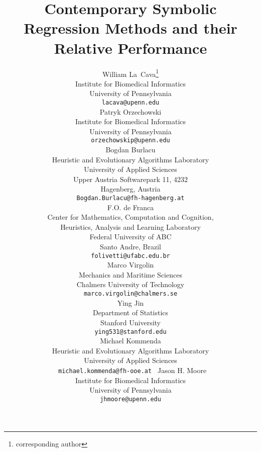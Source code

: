 \documentclass{article}
\title{Contemporary Symbolic Regression Methods and their Relative Performance}
\author{%
        William La~Cava\footnote{corresponding author} \\
        Institute for Biomedical Informatics\\
        University of Pennsylvania\\
        \texttt{lacava@upenn.edu} \\
        \And
        Patryk Orzechowski \\
        Institute for Biomedical Informatics\\
        University of Pennsylvania\\
        \texttt{orzechowskip@upenn.edu} \\
        \And
        Bogdan Burlacu \\
        Heuristic and Evolutionary Algorithms Laboratory \\
        University of Applied Sciences \\ 
        Upper Austria Softwarepark 11, 4232 \\
        Hagenberg, Austria \\
        \texttt{Bogdan.Burlacu@fh-hagenberg.at} \\
        \And
        F.O. de Franca \\
        Center for Mathematics, Computation and Cognition, \\
        Heuristics, Analysis and Learning Laboratory \\
        Federal University of ABC \\
        Santo Andre, Brazil \\
        \texttt{folivetti@ufabc.edu.br} \\
        \And
        Marco Virgolin \\
        Mechanics and Maritime Sciences \\
        Chalmers University of Technology \\
        \texttt{ marco.virgolin@chalmers.se } \\
        \And
        Ying Jin \\
        Department of Statistics \\
        Stanford University \\ 
        \texttt{ying531@stanford.edu} \\
        \And
        Michael Kommenda  \\
        Heuristic and Evolutionary Algorithms Laboratory \\
        University of Applied Sciences \\ 
        \texttt{ michael.kommenda@fh-ooe.at }
        \And
        Jason H. Moore \\ 
        Institute for Biomedical Informatics\\
        University of Pennsylvania \\
        \texttt{ jhmoore@upenn.edu } \\
}
\begin{document}
\maketitle

\begin{abstract}
    
\end{abstract}









\end{document}
